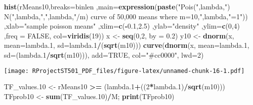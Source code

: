 \documentclass[
]{article}
\newenvironment{Shaded}{\begin{snugshade}}{\end{snugshade}}
\newcommand{\DataTypeTok}[1]{\textcolor[rgb]{0.13,0.29,0.53}{#1}}
\newcommand{\DecValTok}[1]{\textcolor[rgb]{0.00,0.00,0.81}{#1}}
\newcommand{\FloatTok}[1]{\textcolor[rgb]{0.00,0.00,0.81}{#1}}
\newcommand{\KeywordTok}[1]{\textcolor[rgb]{0.13,0.29,0.53}{\textbf{#1}}}
\newcommand{\NormalTok}[1]{#1}
\newcommand{\OperatorTok}[1]{\textcolor[rgb]{0.81,0.36,0.00}{\textbf{#1}}}
\newcommand{\OtherTok}[1]{\textcolor[rgb]{0.56,0.35,0.01}{#1}}
\newcommand{\StringTok}[1]{\textcolor[rgb]{0.31,0.60,0.02}{#1}}
\begin{document}
\begin{Shaded}
\begin{Highlighting}[]
\KeywordTok{hist}\NormalTok{(rMeans10,}\DataTypeTok{breaks=}\NormalTok{binlen ,}\DataTypeTok{main=}\KeywordTok{expression}\NormalTok{(}\KeywordTok{paste}\NormalTok{(}\StringTok{"Pois("}\NormalTok{,lambda,}\StringTok{") ~ N("}\NormalTok{,lambda,}\StringTok{","}\NormalTok{,lambda,}\StringTok{"/m) curve of 50,000 means where m=10,"}\NormalTok{,lambda,}\StringTok{"=1"}\NormalTok{))  ,}\DataTypeTok{xlab=}\StringTok{"sample poisson means"}\NormalTok{ ,}\DataTypeTok{xlim=}\KeywordTok{c}\NormalTok{(}\OperatorTok{-}\FloatTok{0.1}\NormalTok{,}\FloatTok{2.5}\NormalTok{) ,}\DataTypeTok{ylab=}\StringTok{"density"}\NormalTok{ ,}\DataTypeTok{ylim=}\KeywordTok{c}\NormalTok{(}\DecValTok{0}\NormalTok{,}\DecValTok{4}\NormalTok{) ,}\DataTypeTok{freq =} \OtherTok{FALSE}\NormalTok{, }\DataTypeTok{col=}\KeywordTok{viridis}\NormalTok{(}\DecValTok{19}\NormalTok{))}
\NormalTok{x <-}\StringTok{ }\KeywordTok{seq}\NormalTok{(}\DecValTok{0}\NormalTok{,}\DecValTok{2}\NormalTok{, }\DataTypeTok{by =} \FloatTok{0.2}\NormalTok{)}
\NormalTok{y10 <-}\StringTok{ }\KeywordTok{dnorm}\NormalTok{(x, }\DataTypeTok{mean=}\NormalTok{lambda}\FloatTok{.1}\NormalTok{, }\DataTypeTok{sd=}\NormalTok{lambda}\FloatTok{.1}\OperatorTok{/}\NormalTok{(}\KeywordTok{sqrt}\NormalTok{(m10)))}
\KeywordTok{curve}\NormalTok{(}\KeywordTok{dnorm}\NormalTok{(x, }\DataTypeTok{mean=}\NormalTok{lambda}\FloatTok{.1}\NormalTok{, }\DataTypeTok{sd=}\NormalTok{(lambda}\FloatTok{.1}\OperatorTok{/}\KeywordTok{sqrt}\NormalTok{(m10))), }\DataTypeTok{add=}\OtherTok{TRUE}\NormalTok{, }\DataTypeTok{col=}\StringTok{"#cc0000"}\NormalTok{, }\DataTypeTok{lwd=}\DecValTok{2}\NormalTok{)}
\end{Highlighting}
\end{Shaded}

\texttt{[image: RProjectST501\_PDF\_files/figure-latex/unnamed-chunk-16-1.pdf]}

\begin{Shaded}
\begin{Highlighting}[]
\NormalTok{TF_values}\FloatTok{.10}\NormalTok{ <-}\StringTok{ }\NormalTok{rMeans10 }\OperatorTok{>=}\StringTok{ }\NormalTok{(lambda}\FloatTok{.1}\OperatorTok{+}\NormalTok{((}\DecValTok{2}\OperatorTok{*}\NormalTok{lambda}\FloatTok{.1}\NormalTok{)}\OperatorTok{/}\KeywordTok{sqrt}\NormalTok{(m10)))}
\NormalTok{TFprob10 <-}\StringTok{ }\KeywordTok{sum}\NormalTok{(TF_values}\FloatTok{.10}\NormalTok{)}\OperatorTok{/}\NormalTok{M; }\KeywordTok{print}\NormalTok{(TFprob10)}
\end{Highlighting}
\end{Shaded}
\end{document}
